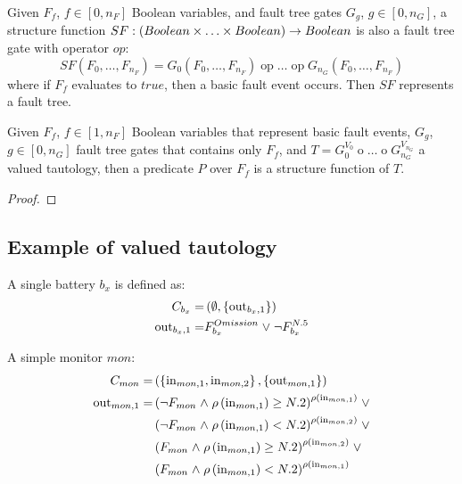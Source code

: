 \begin{definition}
\begin{sloppypar}
Given $F_f$, $f \in [0,n_F]$ Boolean variables, and fault tree gates $G_g$, $g \in [0, n_G]$, a structure function $SF:\left(Boolean \times \ldots \times Boolean\right) \rightarrow Boolean $ is also a fault tree gate with operator $op$:
\[
SF\left(F_0, \ldots, F_{n_F}\right) = G_0\left(F_0, \ldots, F_{n_F}\right) \mathop{op} \ldots \mathop{op} G_{n_G}\left(F_0, \ldots, F_{n_F}\right)
\]
%
where if $F_f$ evaluates to $true$, then a basic fault event occurs.
% 
Then $SF$ represents a fault tree.
\end{sloppypar} 
\end{definition}

\begin{theorem}
Given $F_f$, $f \in [1,n_F]$ Boolean variables that represent basic fault events, $G_g$, $g \in [0,n_G]$ fault tree gates that contains only $F_f$, and $T = G_0^{V_0} \mathop{op_0} \ldots \mathop{op_{n_G}} G_{n_G}^{V_{n_G}}$ a valued tautology, then a predicate $P$ over $F_f$ is a structure function of $T$.
\end{theorem}
\begin{proof}
\end{proof}

\subsection{Example of valued tautology}
%
A single battery $b_x$ is defined as:
\begin{align*}
C_{b_x} = & \left( \emptyset, \left\{\mathrm{out}_{b_x,1}\right\} \right) \\
\mathrm{out}_{b_x,1} = & F_{b_x}^{Omission} \mathrel{\vee} \neg F_{b_x}^{N.5}
\end{align*}

A simple monitor $mon$:
\begin{align*}
C_{mon} = &  \left( 
    \left\{\mathrm{in}_{mon,1}, \mathrm{in}_{mon,2}\right\}, 
    \left\{\mathrm{out}_{mon,1}\right\} 
  \right) \\
\mathrm{out}_{mon,1} = 
  &\left( 
    \neg F_{mon} \mathrel{\wedge} \rho\left(\mathrm{in}_{mon,1}\right) \geq N.2
  \right)^{\rho\left(\mathrm{in}_{mon,1}\right)} \mathrel{\vee} \\
  & \left(
    \neg F_{mon} \mathrel{\wedge} \rho\left(\mathrm{in}_{mon,1}\right) < N.2
  \right)^{\rho\left(\mathrm{in}_{mon,2}\right) } \mathrel{\vee} \\
  & \left(
    F_{mon} \mathrel{\wedge} \rho\left(\mathrm{in}_{mon,1}\right) \geq N.2
  \right)^{\rho\left(\mathrm{in}_{mon,2}\right)} \mathrel{\vee} \\
  & \left(
    F_{mon} \mathrel{\wedge} \rho\left(\mathrm{in}_{mon,1}\right) < N.2
  \right)^{\rho\left(\mathrm{in}_{mon,1}\right)}
\end{align*}

